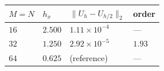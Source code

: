 \begin{tabular}{llll}
\toprule
\(M=N\) & \(h_x\) & \(\|U_h-U_{h/2}\|_2\) & order \\
\midrule
\(16\) & \(2.500\) & \(1.11\times10^{-4}\) & --- \\
\(32\) & \(1.250\) & \(2.92\times10^{-5}\) & \(1.93\) \\
\(64\) & \(0.625\) & (reference) & --- \\
\bottomrule
\end{tabular}
